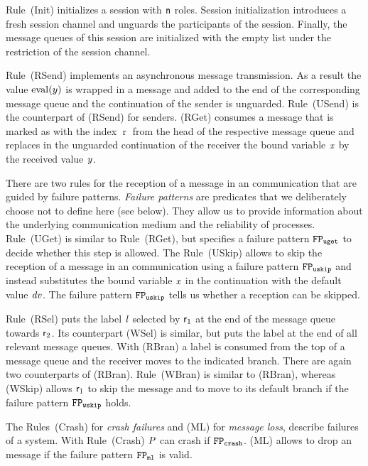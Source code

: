 Rule~(\textsf{Init}) initializes a session with $ \Role[n] $ roles.
Session initialization introduces a fresh session channel and unguards the participants of the session.
Finally, the message queues of this session are initialized with the empty list under the restriction of the session channel.

Rule~(\textsf{RSend}) implements an asynchronous \strongR message transmission.
As a result the value $ \Eval{\Expr[y]} $ is wrapped in a message and added to the end of the corresponding message queue and the continuation of the sender is unguarded.
Rule~(\textsf{USend}) is the counterpart of (\textsf{RSend}) for \unrel senders.
%
(\textsf{RGet}) consumes a message that is marked as \strongR with the index $ \operatorname{r} $ from the head of the respective message queue and replaces in the unguarded continuation of the receiver the bound variable $ \Args $ by the received value $ \Args[y] $.

There are two rules for the reception of a message in an \unrel communication that are guided by failure patterns.
\emph{Failure patterns} are predicates that we deliberately choose not to define here (see below).
They allow us to provide information about the underlying communication medium and the reliability of processes.
Rule~(\textsf{UGet}) is similar to Rule~(\textsf{RGet}), but specifies a failure pattern $ \fpUGet $ to decide whether this step is allowed.
The Rule~(\textsf{USkip}) allows to skip the reception of a message in an \unrel communication using a failure pattern $ \fpUSkip $ and instead substitutes the bound variable $ \Args $ in the continuation with the default value $ \Args[dv] $.
The failure pattern $ \fpUSkip $ tells us whether a reception can be skipped.

Rule~(\textsf{RSel}) puts the label $ \Label $ selected by $ \Role_1 $ at the end of the message queue towards $ \Role_2 $.
Its \weakR counterpart (\textsf{WSel}) is similar, but puts the label at the end of all relevant message queues.
%
With (\textsf{RBran}) a label is consumed from the top of a message queue and the receiver moves to the indicated branch.
There are again two \weakR counterparts of (\textsf{RBran}).
Rule~(\textsf{WBran}) is similar to (\textsf{RBran}), whereas (\textsf{WSkip}) allows $ \Role_1 $ to skip the message and to move to its default branch if the failure pattern $ \fpWSkip $ holds.

The Rules~(\textsf{Crash}) for \emph{crash failures} and (\textsf{ML}) for \emph{message loss}, describe failures of a system.
With Rule~(\textsf{Crash}) $ \PT $ can crash if $ \fpCrash $.
(\textsf{ML}) allows to drop an \unrel message if the failure pattern $ \fpML $ is valid.


